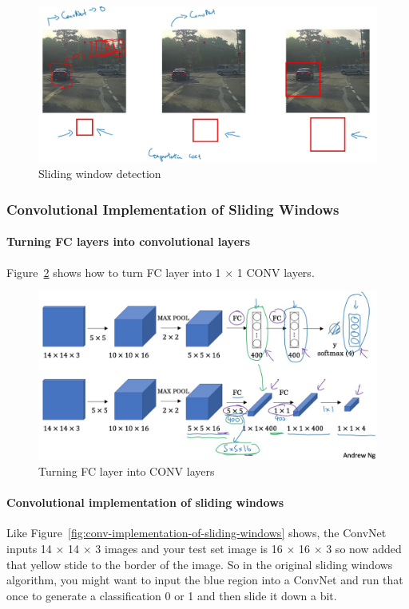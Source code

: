 \documentclass[UTF8]{article}
\begin{document}
\begin{figure}[htb]
    \centering
    \includegraphics[width=40em]{figures/sliding-window-detection}
    \caption{Sliding window detection}
    \label{fig:sliding-window-detection}
\end{figure}

\subsubsection{Convolutional Implementation of Sliding Windows}
\paragraph{Turning FC layers into convolutional layers}
Figure~\ref{fig:turning-fc-layer-into-conv-layers} shows how to turn FC layer into 1 $\times$ 1
CONV layers.

\begin{figure}[htb]
    \centering
    \includegraphics[width=40em]{figures/turning-fc-layer-into-conv-layers}
    \caption{Turning FC layer into CONV layers}
    \label{fig:turning-fc-layer-into-conv-layers}
\end{figure}

\paragraph{Convolutional implementation of sliding windows}
Like Figure~\ref{fig:conv-implementation-of-sliding-windows} shows, the ConvNet inputs 14 $\times$
14 $\times$ 3 images and your test set image is 16 $\times$ 16 $\times$ 3 so now added that yellow
stide to the border of the image. So in the original sliding windows algorithm, you might want to
input the blue region into a ConvNet and run that once to generate a classification 0 or 1 and
then slide it down a bit.
\end{document}
